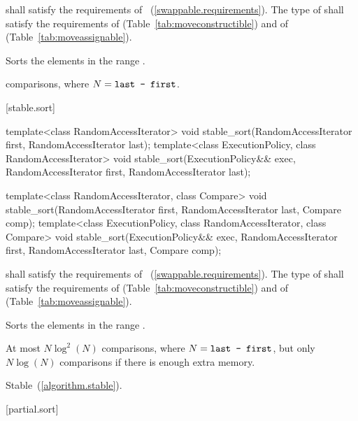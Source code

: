 \begin{itemdescr}
\pnum
\requires
{} shall satisfy the requirements of
~(\ref{swappable.requirements}). The type
of  shall satisfy the requirements of
 (Table~\ref{tab:moveconstructible}) and of
 (Table~\ref{tab:moveassignable}).

\pnum
\effects
Sorts the elements in the range
.

\pnum
\complexity
{} comparisons, where $N = \texttt{last - first}$.
\end{itemdescr}

[stable.sort]{}

%
\begin{itemdecl}
template<class RandomAccessIterator>
  void stable_sort(RandomAccessIterator first, RandomAccessIterator last);
template<class ExecutionPolicy, class RandomAccessIterator>
  void stable_sort(ExecutionPolicy&& exec,
                   RandomAccessIterator first, RandomAccessIterator last);

template<class RandomAccessIterator, class Compare>
  void stable_sort(RandomAccessIterator first, RandomAccessIterator last,
                   Compare comp);
template<class ExecutionPolicy, class RandomAccessIterator, class Compare>
  void stable_sort(ExecutionPolicy&& exec,
                   RandomAccessIterator first, RandomAccessIterator last,
                   Compare comp);
\end{itemdecl}

\begin{itemdescr}
\pnum
\requires
{} shall satisfy the requirements of
~(\ref{swappable.requirements}). The type
of  shall satisfy the requirements of
 (Table~\ref{tab:moveconstructible}) and of
 (Table~\ref{tab:moveassignable}).

\pnum
\effects
Sorts the elements in the range .

\pnum
\complexity
At most $N \log^2(N)$
comparisons, where
$N = \texttt{last - first}$, but only $N \log(N)$ comparisons if there is enough extra memory.

\pnum
\remarks Stable~(\ref{algorithm.stable}).
\end{itemdescr}

[partial.sort]{}


